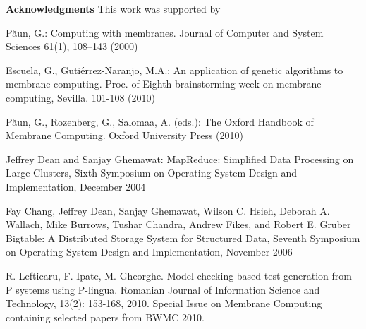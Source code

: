 \documentclass[runningheads]{llncs}
\begin{document}
\textbf{Acknowledgments}
This work was supported by

\begin{thebibliography}{99}

P\u{a}un, G.: Computing with membranes. Journal of Computer and System Sciences 61(1),  108--143 (2000)

Escuela, G., Guti\'errez-Naranjo, M.A.: An application of genetic algorithms to
membrane computing. Proc. of Eighth brainstorming week on membrane computing, Sevilla. 101-108 (2010)

P\u{a}un, G., Rozenberg, G., Salomaa, A. (eds.): The Oxford Handbook of Membrane Computing. Oxford University Press (2010)

Jeffrey Dean and Sanjay Ghemawat: MapReduce: Simplified Data Processing on Large Clusters, Sixth Symposium on Operating System Design and Implementation, December 2004

Fay Chang, Jeffrey Dean, Sanjay Ghemawat, Wilson C. Hsieh, Deborah A. Wallach, Mike Burrows, Tushar Chandra, Andrew Fikes, and Robert E. Gruber Bigtable: A Distributed Storage System for Structured Data, Seventh Symposium on Operating System Design and Implementation, November 2006

R. Lefticaru, F. Ipate, M. Gheorghe. Model checking based test generation from P systems using P-lingua. Romanian Journal of Information Science and Technology, 13(2): 153-168, 2010. Special Issue on Membrane Computing containing selected papers from BWMC 2010.

\end{thebibliography}
\end{document}
